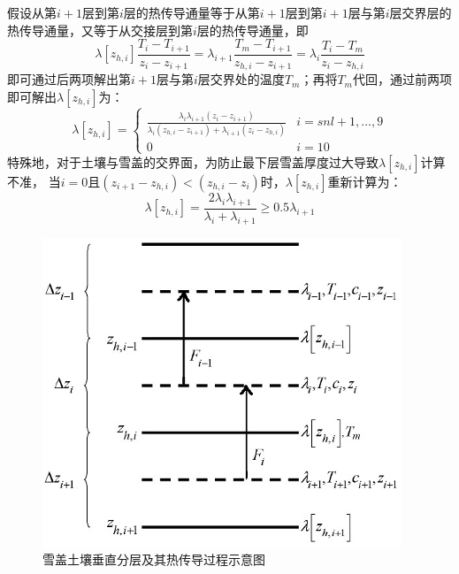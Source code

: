 假设从第$i+1$层到第$i$层的热传导通量等于从第$i+1$层到第$i+1$层与第$i$层交界层的热传导通量，又等于从交接层到第$i$层的热传导通量，即
\begin{equation}
\lambda\left[z_{h, i}\right] \frac{T_{i}-T_{i+1}}{z_{i}-z_{i+1}}=\lambda_{i+1} \frac{T_{m}-T_{i+1}}{z_{h, i}-z_{i+1}}=\lambda_{i} \frac{T_{i}-T_{m}}{z_{i}-z_{h, i}}
\end{equation}
即可通过后两项解出第$i+1$层与第$i$层交界处的温度$T_m$；再将$T_m$代回，通过前两项即可解出$\lambda\left[z_{h,i}\right]$为：
\begin{equation}
\lambda\left[z_{h, i}\right]=\begin{cases}
\frac{\lambda_{i} \lambda_{i+1}\left(z_{i}-z_{i+1}\right)}{\lambda_{i}\left(z_{h, i}-z_{i+1}\right)+\lambda_{i+1}\left(z_{i}-z_{h, i}\right)} & i=snl+1, \ldots, 9 \\ 
0 & i=10
\end{cases}
\end{equation}
特殊地，对于土壤与雪盖的交界面，为防止最下层雪盖厚度过大导致$\lambda\left[z_{h,i}\right]$计算不准，
当$i=0$且$\left(z_{i+1}-z_{h,i}\right)<\left(z_{h,i}-z_i\right)$时，$\lambda\left[z_{h,i}\right]$重新计算为：
\begin{equation}
\lambda\left[z_{h,i}\right]=\frac{2 \lambda_{i} \lambda_{i+1}}{\lambda_{i}+\lambda_{i+1}} \geqslant 0.5 \lambda_{i+1}
\end{equation}
{
\begin{figure}[htbp]
\centering
\includegraphics{Figures/雪盖土壤热力过程/雪盖土壤垂直分层及其热传导过程示意图.png}
\caption{雪盖土壤垂直分层及其热传导过程示意图}
\label{fig:雪盖土壤垂直分层及其热传导过程示意图}
\end{figure}
}


